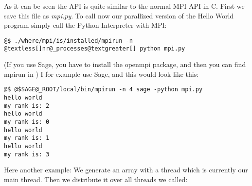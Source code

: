 \documentclass[letterpaper,10pt,english]{manual}
\begin{document}
As it can be seen the API is quite similar to the normal MPI API in C.
First we save this file as \emph{mpi.py}.
To call now our parallized version of the Hello World program simply
call the Python Interpreter with MPI:

\begin{Verbatim}[commandchars=@\[\]]
@$ ./where/mpi/is/installed/mpirun -n @textless[]nr@_processes@textgreater[] python mpi.py
\end{Verbatim}

(If you use Sage, you have to install the openmpi package, and then you
can find mpirun in )
I for example use Sage, and this would look like this:

\begin{Verbatim}[commandchars=@\[\]]
@$ @$SAGE@_ROOT/local/bin/mpirun -n 4 sage -python mpi.py
hello world
my rank is: 2
hello world
my rank is: 0
hello world
my rank is: 1
hello world
my rank is: 3
\end{Verbatim}

Here another example: We generate an array with a thread which is
currently our main thread. Then we distribute it over all threads we
called:
\end{document}

